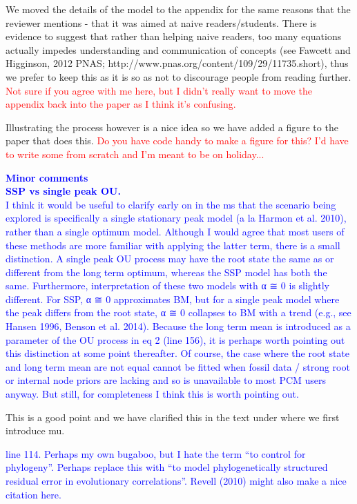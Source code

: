\documentclass[12pt]{letter}
\begin{document}
\begin{letter}{}
We moved the details of the model to the appendix for the same reasons that the reviewer mentions - that it was aimed at naive readers/students. There is evidence to suggest that rather than helping naive readers, too many equations actually impedes understanding and communication of concepts (see Fawcett and Higginson, 2012 PNAS; http://www.pnas.org/content/109/29/11735.short), thus we prefer to keep this as it is so as not to discourage people from reading further.
\textcolor{red}{Not sure if you agree with me here, but I didn't really want to move the appendix back into the paper as I think it's confusing.}

Illustrating the process however is a nice idea so we have added a figure to the paper that does this. 
\textcolor{red}{Do you have code handy to make a figure for this? I'd have to write some from scratch and I'm meant to be on holiday...}

\textcolor{blue}{\textbf{Minor comments}\\
\textbf{SSP vs single peak OU.}\\
I think it would be useful to clarify early on in the ms that the scenario being explored is specifically a single stationary peak model (a la Harmon et al. 2010), rather than a single optimum model. Although I would agree that most users of these methods are more familiar with applying the latter term, there is a small distinction. A single peak OU process may have the root state the same as or different from the long term optimum, whereas the SSP model has both the same. Furthermore, interpretation of these two models with α ≅ 0 is slightly different. For SSP, α ≅ 0 approximates BM, but for a single peak model where the peak differs from the root state, α ≅ 0 collapses to BM with a trend (e.g., see Hansen 1996, Benson et al. 2014). Because the long term mean is introduced as a parameter of the OU process in eq 2 (line 156), it is perhaps worth pointing out this distinction at some point thereafter. Of course, the case where the root state and long term mean are not equal cannot be fitted when fossil data / strong root or internal node priors are lacking and so is unavailable to most PCM users anyway. But still, for completeness I think this is worth pointing out.}

This is a good point and we have clarified this in the text under where we first introduce mu. 

\textcolor{blue}{line 114. Perhaps my own bugaboo, but I hate the term “to control for phylogeny”. Perhaps replace this with “to model phylogenetically structured residual error in evolutionary correlations”. Revell (2010) might also make a nice citation here.}


\end{letter}
\end{document}
